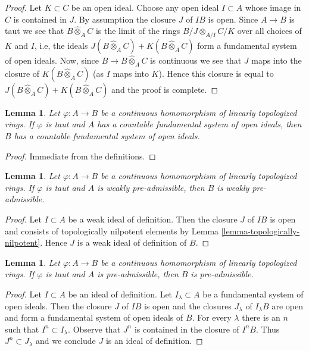 \documentclass{stacks-project}
\theoremstyle{plain}
\newtheorem{lemma}[subsection]{Lemma}
\theoremstyle{definition}
\theoremstyle{remark}
\numberwithin{equation}{subsection}
\begin{document}
\begin{proof}
Let $K \subset C$ be an open ideal. Choose any open ideal $I \subset A$
whose image in $C$ is contained in $J$. By assumption the closure $J$
of $IB$ is open. Since $A \to B$ is taut we see that
$B \widehat{\otimes}_A C$ is the limit of the rings $B/J \otimes_{A/I} C/K$
over all choices of $K$ and $I$, i.e,
the ideals $J(B \widehat{\otimes}_A C) + K(B \widehat{\otimes}_A C)$
form a fundamental system of open ideals. Now,
since $B \to B \widehat{\otimes}_A C$ is continuous we see
that $J$ maps into the closure of $K(B \widehat{\otimes}_A C)$
(as $I$ maps into $K$). Hence this closure is equal to
$J(B \widehat{\otimes}_A C) + K(B \widehat{\otimes}_A C)$
and the proof is complete.
\end{proof}

\begin{lemma}
\label{lemma-taut-ascent-countable}
Let $\varphi : A \to B$ be a continuous homomorphism of
linearly topologized rings. If $\varphi$ is taut and $A$
has a countable fundamental system of open ideals, then
$B$ has a countable fundamental system of open ideals.
\end{lemma}

\begin{proof}
Immediate from the definitions.
\end{proof}

\begin{lemma}
\label{lemma-taut-ascent-weakly-admissible}
Let $\varphi : A \to B$ be a continuous homomorphism of
linearly topologized rings. If $\varphi$ is taut and $A$
is weakly pre-admissible, then $B$ is weakly pre-admissible.
\end{lemma}

\begin{proof}
Let $I \subset A$ be a weak ideal of definition. Then the closure
$J$ of $IB$ is open and consists of topologically nilpotent elements
by Lemma \ref{lemma-topologically-nilpotent}. Hence $J$ is a weak
ideal of definition of $B$.
\end{proof}

\begin{lemma}
\label{lemma-taut-ascent-admissible}
Let $\varphi : A \to B$ be a continuous homomorphism of
linearly topologized rings. If $\varphi$ is taut and $A$
is pre-admissible, then $B$ is pre-admissible.
\end{lemma}

\begin{proof}
Let $I \subset A$ be an ideal of definition. Let
$I_\lambda \subset A$ be a fundamental system of open ideals.
Then the closure $J$ of $IB$ is open and the
closures $J_\lambda$ of $I_\lambda B$ are open and form a
fundamental system of open ideals of $B$.
For every $\lambda$ there is an $n$ such that $I^n \subset I_\lambda$.
Observe that $J^n$ is contained in the closure of $I^nB$.
Thus $J^n \subset J_\lambda$ and we conclude $J$ is an
ideal of definition.
\end{proof}
\end{document}

